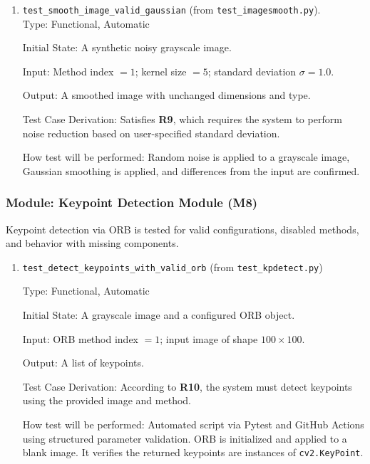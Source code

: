 \documentclass[12pt, titlepage]{article}
\begin{document}
\begin{enumerate}
  \item \texttt{test\_smooth\_image\_valid\_gaussian} \textnormal{(from \texttt{test\_imagesmooth.py})}. \\

Type: Functional, Automatic

Initial State: A synthetic noisy grayscale image.

Input: Method index \(= 1\); kernel size \(= 5\); standard deviation \(\sigma = 1.0\).

Output: A smoothed image with unchanged dimensions and type.

Test Case Derivation: Satisfies \textbf{R9}, which requires the system to perform noise reduction based on user-specified standard deviation.


How test will be performed: Random noise is applied to a grayscale image, Gaussian smoothing is applied, and differences from the input are confirmed.
\end{enumerate}


\subsubsection{Module: Keypoint Detection Module (M8)}
Keypoint detection via ORB is tested for valid configurations, disabled methods, and behavior with missing components.

\begin{enumerate}
  \item \texttt{test\_detect\_keypoints\_with\_valid\_orb} \textnormal{(from \texttt{test\_kpdetect.py})}
  
  Type: Functional, Automatic
  
  Initial State: A grayscale image and a configured ORB object.
  
  Input: ORB method index \(= 1\); input image of shape \(100 \times 100\).
  
  Output: A list of keypoints.
  
  Test Case Derivation: According to \textbf{R10}, the system must detect keypoints using the provided image and method.
  
  How test will be performed: Automated script via Pytest and GitHub Actions using structured parameter validation. ORB is initialized and applied to a blank image. It verifies the returned keypoints are instances of \texttt{cv2.KeyPoint}.
  \end{enumerate}
  
\end{document}

